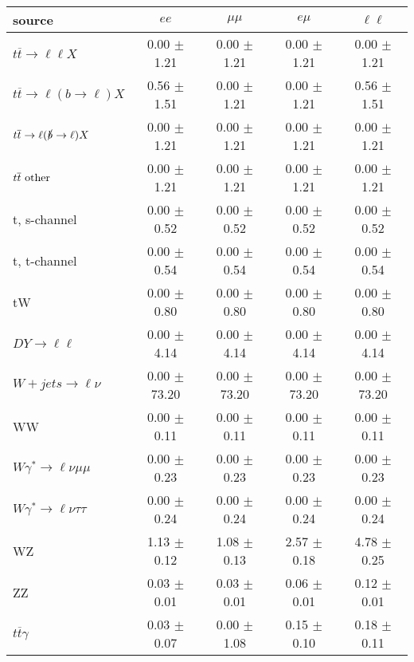 \begin{tabular}{l|cccc} \hline\hline
source & $ee$ & $\mu\mu$ & $e\mu$ & $\ell\ell $ \\
\hline
$t\overline{t} \rightarrow \ell \ell X$ &  0.00 $\pm$  1.21 &  0.00 $\pm$  1.21 &  0.00 $\pm$  1.21 &  0.00 $\pm$  1.21 \\
$t\overline{t} \rightarrow \ell (b \rightarrow \ell) X$ &  0.56 $\pm$  1.51 &  0.00 $\pm$  1.21 &  0.00 $\pm$  1.21 &  0.56 $\pm$  1.51 \\
$t\overline{t} \rightarrow \ell (\slashed b \rightarrow \ell) X$ &  0.00 $\pm$  1.21 &  0.00 $\pm$  1.21 &  0.00 $\pm$  1.21 &  0.00 $\pm$  1.21 \\
        $t\overline{t}\ \rm{other}$ &  0.00 $\pm$  1.21 &  0.00 $\pm$  1.21 &  0.00 $\pm$  1.21 &  0.00 $\pm$  1.21 \\
\hline
                       t, s-channel &  0.00 $\pm$  0.52 &  0.00 $\pm$  0.52 &  0.00 $\pm$  0.52 &  0.00 $\pm$  0.52 \\
                       t, t-channel &  0.00 $\pm$  0.54 &  0.00 $\pm$  0.54 &  0.00 $\pm$  0.54 &  0.00 $\pm$  0.54 \\
                                 tW &  0.00 $\pm$  0.80 &  0.00 $\pm$  0.80 &  0.00 $\pm$  0.80 &  0.00 $\pm$  0.80 \\
\hline
         $DY \rightarrow \ell \ell$ &  0.00 $\pm$  4.14 &  0.00 $\pm$  4.14 &  0.00 $\pm$  4.14 &  0.00 $\pm$  4.14 \\
      $W+jets \rightarrow \ell \nu$ &  0.00 $\pm$ 73.20 &  0.00 $\pm$ 73.20 &  0.00 $\pm$ 73.20 &  0.00 $\pm$ 73.20 \\
                                 WW &  0.00 $\pm$  0.11 &  0.00 $\pm$  0.11 &  0.00 $\pm$  0.11 &  0.00 $\pm$  0.11 \\
\hline
$W\gamma^{*} \rightarrow \ell \nu \mu\mu$ &  0.00 $\pm$  0.23 &  0.00 $\pm$  0.23 &  0.00 $\pm$  0.23 &  0.00 $\pm$  0.23 \\
$W\gamma^{*} \rightarrow \ell \nu \tau\tau$ &  0.00 $\pm$  0.24 &  0.00 $\pm$  0.24 &  0.00 $\pm$  0.24 &  0.00 $\pm$  0.24 \\
                                 WZ &  1.13 $\pm$  0.12 &  1.08 $\pm$  0.13 &  2.57 $\pm$  0.18 &  4.78 $\pm$  0.25 \\
                                 ZZ &  0.03 $\pm$  0.01 &  0.03 $\pm$  0.01 &  0.06 $\pm$  0.01 &  0.12 $\pm$  0.01 \\
\hline
              $t\overline{t}\gamma$ &  0.03 $\pm$  0.07 &  0.00 $\pm$  1.08 &  0.15 $\pm$  0.10 &  0.18 $\pm$  0.11 \\

\end{tabular}
